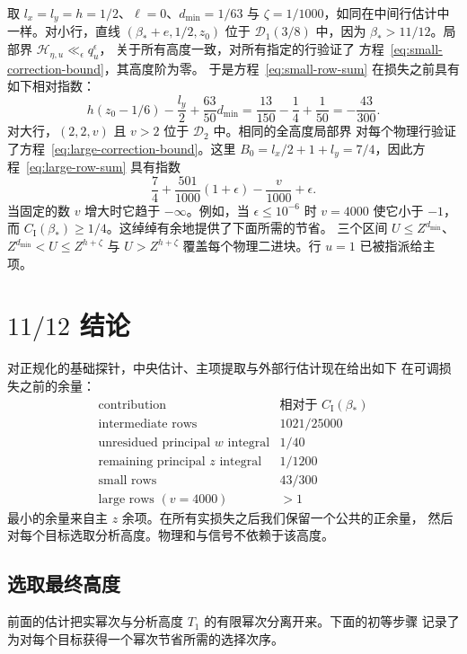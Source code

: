 \documentclass[11pt,a4paper]{article}
\numberwithin{equation}{section}
\numberwithin{figure}{section}
\theoremstyle{definition}
\theoremstyle{remark}
\begin{document}
取 $l_x=l_y=h=1/2$、$\ell=0$、$d_{\min}=1/63$ 与
$\zeta=1/1000$，如同在中间行估计中一样。对小行，直线
$(\beta_*+e,1/2,z_0)$ 位于 $\mathcal D_1(3/8)$ 中，因为
$\beta_*>11/12$。局部界 $\mathcal H_{\eta,u}\ll_\epsilon q_u^\epsilon$，
关于所有高度一致，对所有指定的行验证了
方程~\eqref{eq:small-correction-bound}，其高度阶为零。
于是方程~\eqref{eq:small-row-sum} 在损失之前具有如下相对指数：
\[
 h(z_0-1/6)-\frac{l_y}{2}+\frac{63}{50}d_{\min}
 =\frac{13}{150}-\frac14+\frac1{50}
 =-\frac{43}{300}.
\]
对大行，$(2,2,v)$ 且 $v>2$ 位于 $\mathcal D_2$ 中。相同的全高度局部界
对每个物理行验证了方程~\eqref{eq:large-correction-bound}。这里
$B_0=l_x/2+1+l_y=7/4$，因此方程~\eqref{eq:large-row-sum} 具有指数
\[
 \frac74+\frac{501}{1000}(1+\epsilon)-\frac v{1000}+\epsilon.
\]
当固定的数 $v$ 增大时它趋于 $-\infty$。例如，当
$\epsilon\le10^{-6}$ 时 $v=4000$ 使它小于 $-1$，而
$C_{\mathrm I}(\beta_*)\ge1/4$。这绰绰有余地提供了下面所需的节省。
三个区间 $U\le Z^{d_{\min}}$、$Z^{d_{\min}}<U\le Z^{h+\zeta}$ 与
$U>Z^{h+\zeta}$ 覆盖每个物理二进块。行 $u=1$ 已被指派给主项。

\section{\texorpdfstring{$11/12$}{11/12} 结论}
\label{sec:eleven-twelfths-conclusion}

对正规化的基础探针，中央估计、主项提取与外部行估计现在给出如下
在可调损失之前的余量：
\[
\begin{array}{c|c}
 \text{contribution}&\text{相对于 }C_{\mathrm I}(\beta_*)\\\hline
 \text{intermediate rows}&1021/25000\\
 \text{unresidued principal }w\text{ integral}&1/40\\
 \text{remaining principal }z\text{ integral}&1/1200\\
 \text{small rows}&43/300\\
 \text{large rows }(v=4000)&>1
\end{array}
\]
最小的余量来自主 $z$ 余项。在所有实损失之后我们保留一个公共的正余量，
然后对每个目标选取分析高度。物理和与信号不依赖于该高度。

\subsection{选取最终高度}

前面的估计把实幂次与分析高度 $T_1$ 的有限幂次分离开来。下面的初等步骤
记录了为对每个目标获得一个幂次节省所需的选择次序。
\end{document}
